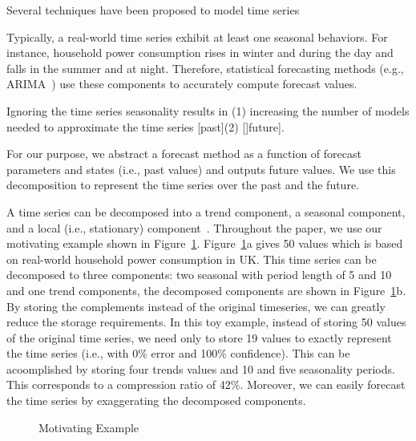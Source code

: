 Several techniques have been proposed to model  time series 
 
Typically, a real-world time series  exhibit at least one  seasonal behaviors. For instance, household power consumption rises in winter and during the day and falls in the summer and at night.
Therefore, statistical  forecasting methods (e.g., ARIMA~\cite{tBOX76a}) use these components  to accurately compute forecast values. 	






Ignoring the time series seasonality  results in (1) increasing the number of models needed to approximate the time series [past](2) []future]. 






   
 For our purpose, we abstract a forecast method as a function of forecast parameters and states (i.e., past values) and outputs future values. We use this decomposition to represent the time series over the past and the future.
 
 

A time series  can be decomposed into a trend component, a seasonal component, and a local (i.e., stationary) component~\cite{Decompose}. 
Throughout the paper, we use our motivating example shown in Figure~\ref{fig:example}. 
Figure~\ref{fig:example}a gives 50 values which is based on real-world household power consumption in UK.  This time series can be decomposed to three components: two seasonal with period length of 5 and 10  and one trend components, the decomposed components are  shown in Figure~\ref{fig:example}b. 
By storing the complements instead of the original timeseries,  we can greatly reduce the storage requirements. In this toy example, instead of storing  50 values of the original time series, we need only to store 19 values to exactly represent the time series (i.e., with 0\% error and 100\% confidence). This can be acoomplished by storing  four trends values and  10 and five seasonality periods. This corresponds to a compression ratio of 42\%. Moreover, we can easily forecast the time series by exaggerating the decomposed components.
\begin{figure}[th]
\center
{}
\caption{Motivating Example}
\label{fig:example}
\end{figure} 

